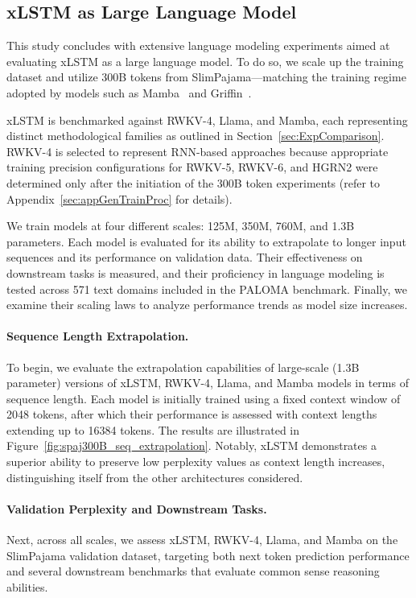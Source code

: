 \subsection{xLSTM as Large Language Model}
\label{sec:ExpLanguage}

This study concludes with extensive language modeling experiments aimed at evaluating xLSTM as a large language model. To do so, we scale up the training dataset and utilize 300B tokens from SlimPajama—matching the training regime adopted by models such as Mamba~\citep{Gu:24arxiv} and Griffin~\citep{De:24arxiv}.

xLSTM is benchmarked against RWKV-4, Llama, and Mamba, each representing distinct methodological families as outlined in Section~\ref{sec:ExpComparison}. RWKV-4 is selected to represent RNN-based approaches because appropriate training precision configurations for RWKV-5, RWKV-6, and HGRN2 were determined only after the initiation of the 300B token experiments (refer to Appendix~\ref{sec:appGenTrainProc} for details).

We train models at four different scales: 125M, 350M, 760M, and 1.3B parameters. Each model is evaluated for its ability to extrapolate to longer input sequences and its performance on validation data. Their effectiveness on downstream tasks is measured, and their proficiency in language modeling is tested across 571 text domains included in the PALOMA benchmark. Finally, we examine their scaling laws to analyze performance trends as model size increases.

\paragraph{Sequence Length Extrapolation.}
\label{sec:spaj300B_ctx_extrapolation}
To begin, we evaluate the extrapolation capabilities of large-scale (1.3B parameter) versions of xLSTM, RWKV-4, Llama, and Mamba models in terms of sequence length. Each model is initially trained using a fixed context window of 2048 tokens, after which their performance is assessed with context lengths extending up to 16384 tokens. The results are illustrated in Figure~\ref{fig:spaj300B_seq_extrapolation}. Notably, xLSTM demonstrates a superior ability to preserve low perplexity values as context length increases, distinguishing itself from the other architectures considered.

\paragraph{Validation Perplexity and Downstream Tasks.}
\label{sec:spaj_downstream_eval}
Next, across all scales, we assess xLSTM, RWKV-4, Llama, and Mamba on the SlimPajama validation dataset, targeting both next token prediction performance and several downstream benchmarks that evaluate common sense reasoning abilities.

